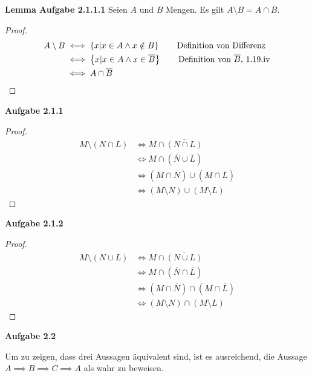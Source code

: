 \documentclass[12pt]{extarticle}
\begin{document}
\textbf{Lemma Aufgabe 2.1.1.1} Seien \(A\) und \(B\) Mengen.  Es gilt \(A \setminus B = A \cap \overline{B}\).
\begin{proof}
  \begin{align*}
    A \setminus B
    &\iff \left\{ x|x \in A \wedge x \notin B \right\}
      \tag*{Definition von Differenz}\\
    &\iff \left\{ x|x \in A \wedge x \in \overline{B} \right\}
      \tag*{Definition von \(\overline{B}\), 1.19.iv}\\
    &\iff A \cap \overline{B}
  \end{align*}
\end{proof}

\textbf{Aufgabe 2.1.1}
\begin{proof}
  \begin{align*}
    M \setminus (N \cap L)
    &\iff M \cap \overline{\left( N \cap L \right)}
      \tag*{Lemma} \\
    &\iff M \cap \left( \overline{N} \cup \overline{L} \right)
      \tag*{De Morgan'sche Regeln}\\
    &\iff (M \cap \overline{N}) \cup (M \cap \overline{L}) \tag*{Distributivität}\\
    &\iff (M \setminus N) \cup (M \setminus L) \tag*{Lemma}
  \end{align*}
\end{proof}

\textbf{Aufgabe 2.1.2}
\begin{proof}
  \begin{align*}
    M \setminus (N \cup L)
    &\iff M \cap \overline{\left( N \cup L \right)}
      \tag*{Lemma} \\
    &\iff M \cap \left( \overline{N} \cap \overline{L} \right)
      \tag*{De Morgan'sche Regeln}\\
    &\iff (M \cap \overline{N}) \cap (M \cap \overline{L}) \tag*{Distributivität}\\
    &\iff (M \setminus N) \cap (M \setminus L) \tag*{Lemma}
  \end{align*}
\end{proof}


\textbf{Aufgabe 2.2}

Um zu zeigen, dass drei Aussagen äquivalent sind, ist es ausreichend,
die Aussage \(A \implies B \implies C \implies A\) als wahr zu beweisen.
\end{document}

